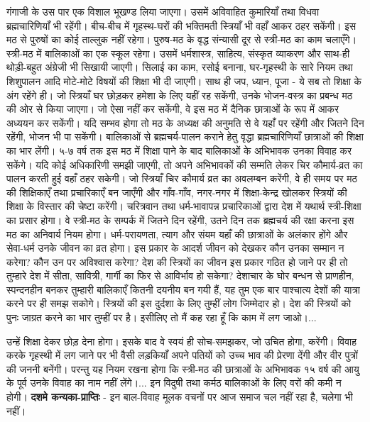 गंगाजी के उस पार एक विशाल भूखण्ड लिया जाएगा। उसमें अविवाहित कुमारियाँ तथा विधवा ब्रह्मचारिणियाँ भी रहेंगी। बीच-बीच में गृहस्थ-घरों की भक्तिमती स्त्रियाँ भी वहाँ आकर ठहर सकेंगी। इस मठ से पुरुषों का कोई ताल्लुक नहीं रहेगा। पुरुष-मठ के वृद्ध संन्यासी दूर से स्त्री-मठ का काम चलाएँगे। स्त्री-मठ में बालिकाओं का एक स्कूल रहेगा। उसमें धर्मशास्त्र, साहित्य, संस्कृत व्याकरण और साथ-ही थोड़ी-बहुत अंग्रेजी भी सिखायी जाएगी। सिलाई का काम, रसोई बनाना, घर-गृहस्थी के सारे नियम तथा शिशुपालन आदि मोटे-मोटे विषयों की शिक्षा भी दी जाएगी। साथ ही जप, ध्यान, पूजा - ये सब तो शिक्षा के अंग रहेंगे ही। जो स्त्रियाँ घर छोड़कर हमेशा के लिए यहीं रह सकेंगी, उनके भोजन-वस्त्र का प्रबन्ध मठ की ओर से किया जाएगा। जो ऐसा नहीं कर सकेंगी, वे इस मठ में दैनिक छात्राओं के रूप में आकर अध्ययन कर सकेंगी। यदि सम्भव होगा तो मठ के अध्यक्ष की अनुमति से वे यहाँ पर रहेंगी और जितने दिन रहेंगी, भोजन भी पा सकेंगी। बालिकाओं से ब्रह्मचर्य-पालन कराने हेतु वृद्धा ब्रह्मचारिणियाँ छात्राओं की शिक्षा का भार लेंगी। ५-७ वर्ष तक इस मठ में शिक्षा पाने के बाद बालिकाओं के अभिभावक उनका विवाह कर सकेंगे। यदि कोई अधिकारिणी समझी जाएगी, तो अपने अभिभावकों की सम्मति लेकर चिर कौमार्य-व्रत का पालन करती हुई वहाँ ठहर सकेगी। जो स्त्रियाँ चिर कौमार्य व्रत का अवलम्बन करेंगी, वे ही समय पर मठ की शिक्षिकाएँ तथा प्रचारिकाएँ बन जाएँगी और गाँव-गाँव, नगर-नगर में शिक्षा-केन्द्र खोलकर स्त्रियों की शिक्षा के विस्तार की चेष्टा करेंगी। चरित्रवान तथा धर्म-भावापन्न प्रचारिकाओं द्वारा देश में यथार्थ स्त्री-शिक्षा का प्रसार होगा। वे स्त्री-मठ के सम्पर्क में जितने दिन रहेंगी, उतने दिन तक ब्रह्मचर्य की रक्षा करना इस मठ का अनिवार्य नियम होगा। धर्म-परायणता, त्याग और संयम यहाँ की छात्राओं के अलंकार होंगे और सेवा-धर्म उनके जीवन का व्रत होगा। इस प्रकार के आदर्श जीवन को देखकर कौन उनका सम्मान न करेगा? कौन उन पर अविश्वास करेगा? देश की स्त्रियों का जीवन इस प्रकार गठित हो जाने पर ही तो तुम्हारे देश में सीता, सावित्री, गार्गी का फिर से आविर्भाव हो सकेगा? देशाचार के घोर बन्धन से प्राणहीन, स्पन्दनहीन बनकर तुम्हारी बालिकाएँ कितनी दयनीय बन गयी हैं, यह तुम एक बार पाश्चात्य देशों की यात्रा करने पर ही समझ सकोगे। स्त्रियों की इस दुर्दशा के लिए तुम्हीं लोग जिम्मेदार हो। देश की स्त्रियों को पुनः जाग्रत करने का भार तुम्हीं पर है। इसीलिए तो मैं कह रहा हूँ कि काम में लग जाओ।... 

\newpage

उन्हें शिक्षा देकर छोड़ देना होगा। इसके बाद वे स्वयं ही सोच-समझकर, जो उचित होगा, करेंगी। विवाह करके गृहस्थी में लग जाने पर भी वैसी लड़कियाँ अपने पतियों को उच्च भाव की प्रेरणा देंगी और वीर पुत्रों की जननी बनेंगी। परन्तु यह नियम रखना होगा कि स्त्री-मठ की छात्राओं के अभिभावक १५ वर्ष की आयु के पूर्व उनके विवाह का नाम नहीं लेंगे।... इन विदुषी तथा कर्मठ बालिकाओं के लिए वरों की कमी न होगी। \textbf{दशमे कन्यका-प्राप्तिः } - इन बाल-विवाह मूलक वचनों पर आज समाज चल नहीं रहा है, चलेगा भी नहीं।


